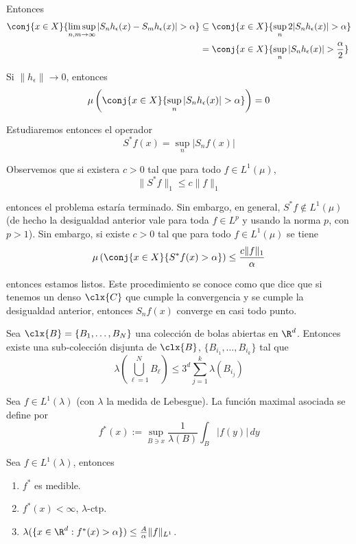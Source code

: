 \documentclass[	docname= Sistemas\ Din\'amicos,
				finished=1,
				semester=1,
				year=2017,
				professor=Godofredo\ Iommi,
				sigla=MAT2565]{apunte}
\begin{document}
Entonces
	\begin{align*}
		\conj{x \in X}{\limsup_{n,m \to \infty} |S_{n}h_{\epsilon}(x) - S_{m}h_{\epsilon}(x)| > \alpha}
			&\subseteq	\conj{x \in X}{\sup_{n} 2|S_{n}h_{\epsilon}(x)| > \alpha}	\\
			&=			\conj{x \in X}{\sup_{n} |S_{n}h_{\epsilon}(x)| > \frac{\alpha}{2}}
	\end{align*}

Si $\|h_{\epsilon}\| \to 0$, entonces
	$$\mu\left(\conj{x \in X}{\sup_{n} |S_{n}h_{\epsilon}(x)| > \alpha}\right) = 0$$

Estudiaremos entonces el operador
	$$S^{*}f(x) = \sup_{n} |S_{n}f(x)|$$

Observemos que si existera $c > 0$ tal que para todo $f \in L^{1}(\mu)$, 
	$$\|S^{*}f\|_{1} \leq c\|f\|_{1}$$

entonces el problema estaría terminado. Sin embargo, en general, $S^{*}f \notin L^{1}(\mu)$ (de hecho la desigualdad anterior vale para toda $f \in L^{p}$ y usando la norma $p$, con $p > 1$). Sin embargo, si existe $c > 0$ tal que para todo $f \in L^{1}(\mu)$ se tiene
	$$\mu\left(\conj{x \in X}{S^{*}f(x) > \alpha}\right) \leq \frac{c\|f\|_{1}}{\alpha}$$

entonces estamos listos. Este procedimiento se conoce como  que dice que si tenemos un denso $\clx{C}$ que cumple la convergencia y se cumple la desigualdad anterior, entonces $S_{n}f(x)$ converge en casi todo punto.

\begin{teo}[Vitali] Sea $\clx{B} = \{B_{1}, \ldots, B_{N}\}$ una colección de bolas abiertas en $\R^{d}$. Entonces existe una sub-colección disjunta de $\clx{B}$, $\{B_{i_{1}}, \ldots, B_{i_{k}}\}$ tal que
	$$\lambda\left(\bigcup_{\ell=1}^{N} B_{\ell}\right) \leq 3^{d}\sum_{j=1}^{k} \lambda(B_{i_{j}})$$
\end{teo}

\begin{defn} Sea $f \in L^{1}(\lambda)$ (con $\lambda$ la medida de Lebesgue). La función maximal asociada se define por
	$$f^{*}(x) := \sup_{B \ni x} \frac{1}{\lambda(B)} \int_{B} |f(y)| \,dy$$
\end{defn}

\begin{teo} Sea $f \in L^{1}(\lambda)$, entonces
	\begin{enumerate}[\indent 1)]
		\item $f^{*}$ es medible.
		\item $f^{*}(x) <\infty$, $\lambda$-ctp.
		\item $\lambda(\{x \in \R^{d} : f^{*}(x) > \alpha\}) \leq \frac{A}{\alpha} \|f\|_{L^{1}}$.
	\end{enumerate}
\end{teo}
\end{document}
